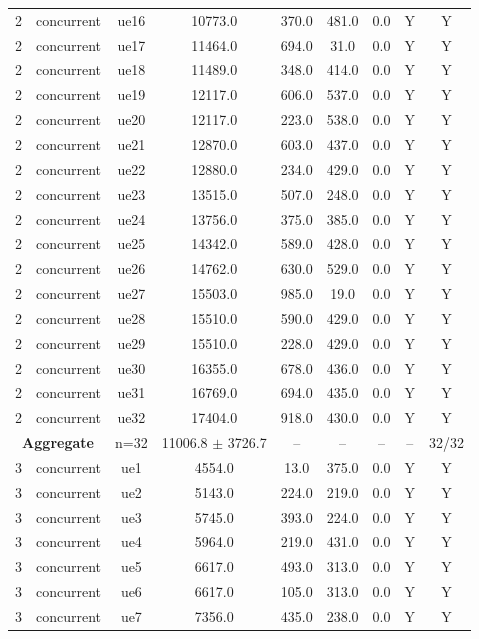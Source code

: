\begin{table}[ht]
\begin{tabular}{|c|c|c|c|c|c|c|c|c|}
2 & concurrent & ue16 & 10773.0 & 370.0 & 481.0 & 0.0 & Y & Y \\
2 & concurrent & ue17 & 11464.0 & 694.0 & 31.0 & 0.0 & Y & Y \\
2 & concurrent & ue18 & 11489.0 & 348.0 & 414.0 & 0.0 & Y & Y \\
2 & concurrent & ue19 & 12117.0 & 606.0 & 537.0 & 0.0 & Y & Y \\
2 & concurrent & ue20 & 12117.0 & 223.0 & 538.0 & 0.0 & Y & Y \\
2 & concurrent & ue21 & 12870.0 & 603.0 & 437.0 & 0.0 & Y & Y \\
2 & concurrent & ue22 & 12880.0 & 234.0 & 429.0 & 0.0 & Y & Y \\
2 & concurrent & ue23 & 13515.0 & 507.0 & 248.0 & 0.0 & Y & Y \\
2 & concurrent & ue24 & 13756.0 & 375.0 & 385.0 & 0.0 & Y & Y \\
2 & concurrent & ue25 & 14342.0 & 589.0 & 428.0 & 0.0 & Y & Y \\
2 & concurrent & ue26 & 14762.0 & 630.0 & 529.0 & 0.0 & Y & Y \\
2 & concurrent & ue27 & 15503.0 & 985.0 & 19.0 & 0.0 & Y & Y \\
2 & concurrent & ue28 & 15510.0 & 590.0 & 429.0 & 0.0 & Y & Y \\
2 & concurrent & ue29 & 15510.0 & 228.0 & 429.0 & 0.0 & Y & Y \\
2 & concurrent & ue30 & 16355.0 & 678.0 & 436.0 & 0.0 & Y & Y \\
2 & concurrent & ue31 & 16769.0 & 694.0 & 435.0 & 0.0 & Y & Y \\
2 & concurrent & ue32 & 17404.0 & 918.0 & 430.0 & 0.0 & Y & Y \\
\multicolumn{2}{|c|}{\textbf{Aggregate}} & n=32 & 11006.8 $\pm$ 3726.7 & -- & -- & -- & -- & 32/32 \\
\hline
3 & concurrent & ue1 & 4554.0 & 13.0 & 375.0 & 0.0 & Y & Y \\
3 & concurrent & ue2 & 5143.0 & 224.0 & 219.0 & 0.0 & Y & Y \\
3 & concurrent & ue3 & 5745.0 & 393.0 & 224.0 & 0.0 & Y & Y \\
3 & concurrent & ue4 & 5964.0 & 219.0 & 431.0 & 0.0 & Y & Y \\
3 & concurrent & ue5 & 6617.0 & 493.0 & 313.0 & 0.0 & Y & Y \\
3 & concurrent & ue6 & 6617.0 & 105.0 & 313.0 & 0.0 & Y & Y \\
3 & concurrent & ue7 & 7356.0 & 435.0 & 238.0 & 0.0 & Y & Y \\

\end{tabular}
\end{table}
